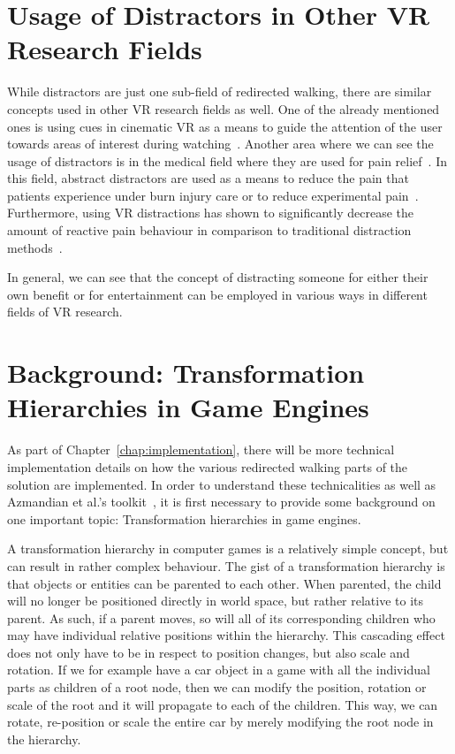 \section{Usage of Distractors in Other VR Research Fields}
While distractors are just one sub-field of redirected walking, there are similar concepts used in other VR research fields as well. One of the already mentioned ones is using cues in cinematic VR as a means to guide the attention of the user towards areas of interest during watching~\cite{nielsen2016missing}. Another area where we can see the usage of distractors is in the medical field where they are used for pain relief~\cite{malloy2010effectiveness, knight2018virtual}. In this field, abstract distractors are used as a means to reduce the pain that patients experience under burn injury care or to reduce experimental pain~\cite{malloy2010effectiveness}. Furthermore, using VR distractions has shown to significantly decrease the amount of reactive pain behaviour in comparison to traditional distraction methods~\cite{knight2018virtual}. 

In general, we can see that the concept of distracting someone for either their own benefit or for entertainment can be employed in various ways in different fields of VR research.

\section{Background: Transformation Hierarchies in Game Engines}
As part of Chapter~\ref{chap:implementation}, there will be more technical implementation details on how the various redirected walking parts of the solution are implemented. In order to understand these technicalities as well as Azmandian et al.'s toolkit~\cite{azmandian2016redirected}, it is first necessary to provide some background on one important topic: Transformation hierarchies in game engines.

A transformation hierarchy in computer games is a relatively simple concept, but can result in rather complex behaviour. The gist of a transformation hierarchy is that objects or entities can be parented to each other. When parented, the child will no longer be positioned directly in world space, but rather relative to its parent. As such, if a parent moves, so will all of its corresponding children who may have individual relative positions within the hierarchy. This cascading effect does not only have to be in respect to position changes, but also scale and rotation. If we for example have a car object in a game with all the individual parts as children of a root node, then we can modify the position, rotation or scale of the root and it will propagate to each of the children. This way, we can rotate, re-position or scale the entire car by merely modifying the root node in the hierarchy.

